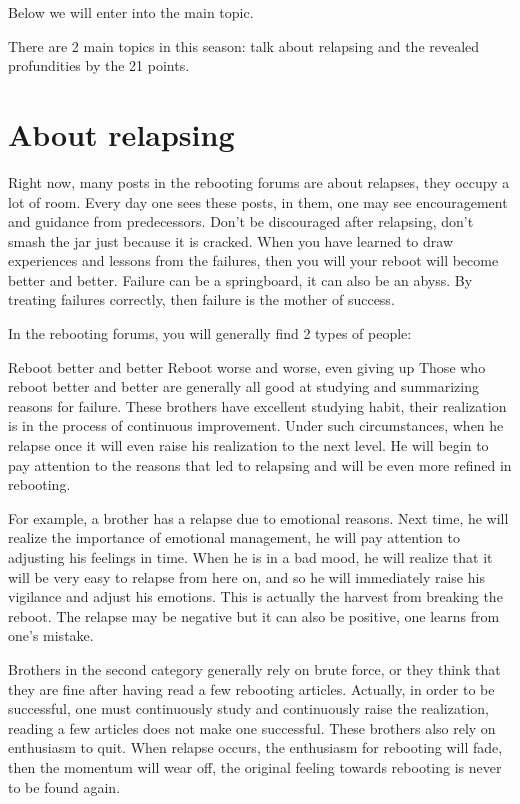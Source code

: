 \documentclass[
]{book}
\begin{document}
Below we will enter into the main topic.

There are 2 main topics in this season: talk about relapsing and the revealed profundities by the 21 points.

\hypertarget{about-relapsing}{%
\section{About relapsing}\label{about-relapsing}}

Right now, many posts in the rebooting forums are about relapses, they occupy a lot of room. Every day one sees these posts, in them, one may see encouragement and guidance from predecessors. Don't be discouraged after relapsing, don't smash the jar just because it is cracked. When you have learned to draw experiences and lessons from the failures, then you will your reboot will become better and better. Failure can be a springboard, it can also be an abyss. By treating failures correctly, then failure is the mother of success.

In the rebooting forums, you will generally find 2 types of people:

Reboot better and better
Reboot worse and worse, even giving up
Those who reboot better and better are generally all good at studying and summarizing reasons for failure. These brothers have excellent studying habit, their realization is in the process of continuous improvement. Under such circumstances, when he relapse once it will even raise his realization to the next level. He will begin to pay attention to the reasons that led to relapsing and will be even more refined in rebooting.

For example, a brother has a relapse due to emotional reasons. Next time, he will realize the importance of emotional management, he will pay attention to adjusting his feelings in time. When he is in a bad mood, he will realize that it will be very easy to relapse from here on, and so he will immediately raise his vigilance and adjust his emotions. This is actually the harvest from breaking the reboot. The relapse may be negative but it can also be positive, one learns from one's mistake.

Brothers in the second category generally rely on brute force, or they think that they are fine after having read a few rebooting articles. Actually, in order to be successful, one must continuously study and continuously raise the realization, reading a few articles does not make one successful. These brothers also rely on enthusiasm to quit. When relapse occurs, the enthusiasm for rebooting will fade, then the momentum will wear off, the original feeling towards rebooting is never to be found again.
\end{document}
